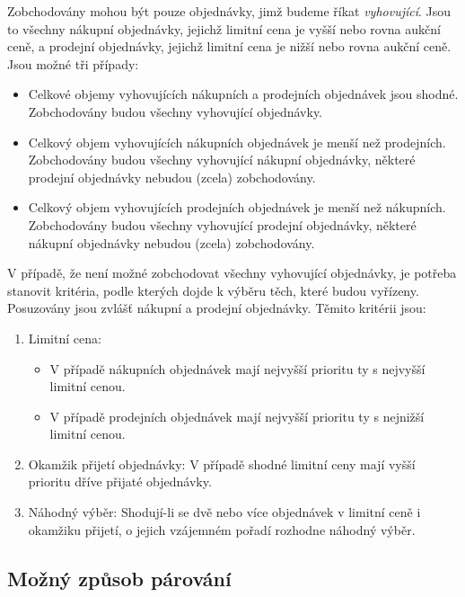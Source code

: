 \documentclass[thesis=M,czech]{FITthesis}[2012/06/26]
\begin{document}
Zobchodovány mohou být pouze objednávky, jimž budeme říkat \textit{vyhovující}. Jsou to všechny nákupní objednávky, jejichž limitní cena 
je vyšší nebo rovna aukční ceně, a prodejní objednávky, jejichž limitní cena je nižší nebo rovna aukční ceně. Jsou možné tři případy:

\begin{itemize}
	\item Celkové objemy vyhovujících nákupních a prodejních objednávek jsou shodné. Zobchodovány budou všechny vyhovující objednávky.
	\item Celkový objem vyhovujících nákupních objednávek je menší než prodejních. Zobchodovány budou všechny vyhovující nákupní 
		objednávky, některé prodejní objednávky nebudou (zcela) zobchodovány.
	\item Celkový objem vyhovujících prodejních objednávek je menší než nákupních. Zobchodovány budou všechny vyhovující prodejní 
		objednávky, některé nákupní objednávky nebudou (zcela) zobchodovány.
\end{itemize}

V případě, že není možné zobchodovat všechny vyhovující objednávky, je potřeba stanovit kritéria, podle kterých dojde k výběru 
těch, které budou vyřízeny. Posuzovány jsou zvlášť nákupní a prodejní objednávky. Těmito kritérii jsou:

\begin{enumerate}
	\item Limitní cena:
		\begin{itemize}
			\item V případě nákupních objednávek mají nejvyšší prioritu ty s nejvyšší limitní cenou.
			\item V případě prodejních objednávek mají nejvyšší prioritu ty s nejnižší limitní cenou.
		\end{itemize}
	\item Okamžik přijetí objednávky: V případě shodné limitní ceny mají vyšší prioritu dříve přijaté objednávky.
	\item Náhodný výběr: Shodují-li se dvě nebo více objednávek v limitní ceně i okamžiku přijetí, o jejich vzájemném pořadí rozhodne 
			náhodný výběr.
\end{enumerate}


\subsection{Možný způsob párování}
\end{document}
